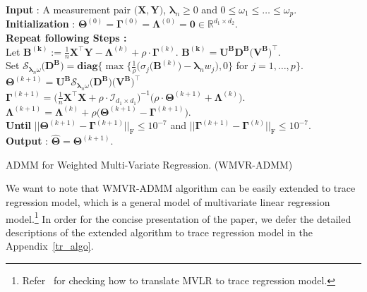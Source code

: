 \documentclass[alpha-refs]{wiley-article}
\begin{document}
\begin{algorithm}[t]
    \textbf{Input} : A measurement pair $\big( \boldsymbol{X}, \boldsymbol{Y} \big)$, $\boldsymbol{\lambda}_{n} \geq 0$ and $0\leq \omega_{1} \leq \dots \leq \omega_{p}$. \\
    \textbf{Initialization} : $\boldsymbol{\Theta}^{(0)}=\boldsymbol{\Gamma}^{(0)}=\boldsymbol{\Lambda}^{(0)}=\boldsymbol{0} \in\mathbb{R}^{d_{1}\times d_{2}}$. \\
    {\bf Repeat following Steps :} \\
     Let $\boldsymbol{B^{(k)}}:=\frac{1}{n}\boldsymbol{X}^{\top}\boldsymbol{Y}-\boldsymbol{\Lambda}^{(k)}+\rho \cdot \boldsymbol{\Gamma}^{(k)}$.
    \quad $\boldsymbol{B^{(k)}}=\boldsymbol{U}^{\textbf{B}}\boldsymbol{D}^{\textbf{B}}\big(\boldsymbol{V}^{\textbf{B}}\big)^{\top}$. \\
    \qquad \qquad \qquad Set $\mathcal{S}_{\boldsymbol{\lambda}_{n}\omega}\big(\boldsymbol{D}^{\textbf{B}}\big)=\textbf{diag}\bigg\{ \max\bigg\{\frac{1}{\rho}\big(\sigma_{j}(\boldsymbol{B}^{(k)}\big)-\boldsymbol{\lambda}_{n} w_{j}\big),0 \bigg\}$ for $j=1,\dots,p \bigg\}$.  \\
    \qquad \qquad \qquad $\boldsymbol{\Theta}^{(k+1)} = \boldsymbol{U}^{\textbf{B}}\mathcal{S}_{\boldsymbol{\lambda}_{n}\omega}\big(\boldsymbol{D}^{\textbf{B}}\big)\big(\boldsymbol{V}^{\textbf{B}}\big)^{\top}$ \\
    $\boldsymbol{\Gamma}^{(k+1)} = \big( \frac{1}{n}\boldsymbol{X}^{\top}\boldsymbol{X}+\rho\cdot\mathcal{I}_{d_{1} \times d_{1}} \big)^{-1}\big( \rho \cdot \boldsymbol{\Theta}^{(k+1)} + \boldsymbol{\Lambda}^{(k)} \big).$\\
     $\boldsymbol{\Lambda}^{(k+1)} = \boldsymbol{\Lambda}^{(k)} + \rho\big( \boldsymbol{\Theta}^{(k+1)}-\boldsymbol{\Gamma}^{(k+1)} \big)$.\\
    {\bf Until} $|| \boldsymbol{\Theta}^{(k+1)}-\boldsymbol{\Gamma}^{(k+1)} ||_{\text{F}}\leq 10^{-7}$ and $|| \boldsymbol{\Gamma}^{(k+1)}-\boldsymbol{\Gamma}^{(k)} ||_{\text{F}}\leq 10^{-7}$. \\
    \textbf{Output} : $\widehat{\boldsymbol{\Theta}}=\boldsymbol{\Theta}^{(k+1)}$.
    \caption{ADMM for Weighted Multi-Variate Regression. (WMVR-ADMM)}
    \label{alg:1}
\end{algorithm}

\begin{remark}
We want to note that WMVR-ADMM algorithm can be easily extended to trace regression model, which is a general model of multivariate linear regression model.\footnote{Refer~\citet{negahban2011estimation} for checking how to translate MVLR to trace regression model.}
In order for the concise presentation of the paper, we defer the detailed descriptions of the extended algorithm to trace regression model in the Appendix~\ref{tr_algo}.
\end{remark}
\end{document}
